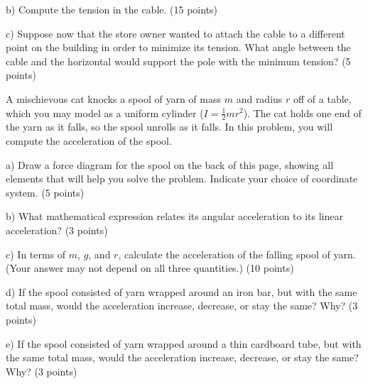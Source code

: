 \documentclass[12pt]{article}
\begin{document}
\bigskip

b) Compute the tension in the cable. (15 points)

\vspace{2 in}

c) Suppose now that the store owner wanted to attach the cable to a different point on the building in order to minimize its tension. What angle between the 
cable and the horizontal would support the pole with the minimum tension? (5 points)
\newpage


\Large \centerline{}
\rm
\normalsize
A mischievous cat knocks a spool of yarn of mass $m$ and radius $r$ off of a table, which you may model as a uniform cylinder ($I=\frac{1}{2}mr^2$). The cat holds one end of the yarn as it falls, so the spool unrolls as it falls. In this problem,
you will compute the acceleration of the spool.

\bigskip
\bigskip

\it

a) Draw a force diagram for the spool on the back of this page, showing all elements that will help you solve the problem. Indicate your choice of coordinate system. (5 points)

\bigskip

b) What mathematical expression relates its angular acceleration to its linear acceleration? (3 points)

\vspace{1in}

c) In terms of $m$, $g$, and $r$, calculate the acceleration of the falling spool of yarn. (Your answer may not depend on all three quantities.) (10 points)

\vspace{2.5in}

d) If the spool consisted of yarn wrapped around an iron bar, but with the same total mass, would the acceleration increase, decrease, or stay the same? Why? (3 points)

\vspace{0.5in}

e) If the spool consisted of yarn wrapped around a thin cardboard tube, but with the same total mass, would the acceleration increase, decrease, or stay the same? Why? (3 points)



\newpage
\Large\centerline{}
\newpage
\Large\centerline{}
\newpage
\end{document}
